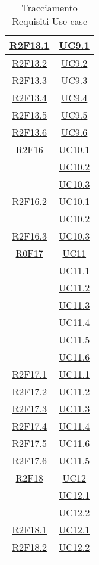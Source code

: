 \begin{longtable}{|c|c|}
\hline
\hyperlink{R2F13.1}{R2F13.1} & \hyperlink{UC9.1}{UC9.1}\\
\hline
\hyperlink{R2F13.2}{R2F13.2} & \hyperlink{UC9.2}{UC9.2}\\
\hline
\hyperlink{R2F13.3}{R2F13.3} & \hyperlink{UC9.3}{UC9.3}\\
\hline
\hyperlink{R2F13.4}{R2F13.4} & \hyperlink{UC9.4}{UC9.4}\\
\hline
\hyperlink{R2F13.5}{R2F13.5} & \hyperlink{UC9.5}{UC9.5}\\
\hline
\hyperlink{R2F13.6}{R2F13.6} & \hyperlink{UC9.6}{UC9.6}\\
\hline
\hyperlink{R2F16}{R2F16} & \hyperlink{UC10.1}{UC10.1}\\
& \hyperlink{UC10.2}{UC10.2}\\
& \hyperlink{UC10.3}{UC10.3}\\
\hline
\hyperlink{R2F16.2}{R2F16.2} & \hyperlink{UC10.1}{UC10.1}\\
& \hyperlink{UC10.2}{UC10.2}\\
\hline
\hyperlink{R2F16.3}{R2F16.3} & \hyperlink{UC10.3}{UC10.3}\\
\hline
\hyperlink{R0F17}{R0F17} & \hyperlink{UC11}{UC11}\\
& \hyperlink{UC11.1}{UC11.1}\\
& \hyperlink{UC11.2}{UC11.2}\\
& \hyperlink{UC11.3}{UC11.3}\\
& \hyperlink{UC11.4}{UC11.4}\\
& \hyperlink{UC11.5}{UC11.5}\\
& \hyperlink{UC11.6}{UC11.6}\\
\hline
\hyperlink{R2F17.1}{R2F17.1} & \hyperlink{UC11.1}{UC11.1}\\
\hline
\hyperlink{R2F17.2}{R2F17.2} & \hyperlink{UC11.2}{UC11.2}\\
\hline
\hyperlink{R2F17.3}{R2F17.3} & \hyperlink{UC11.3}{UC11.3}\\
\hline
\hyperlink{R2F17.4}{R2F17.4} & \hyperlink{UC11.4}{UC11.4}\\
\hline
\hyperlink{R2F17.5}{R2F17.5} & \hyperlink{UC11.6}{UC11.6}\\
\hline
\hyperlink{R2F17.6}{R2F17.6} & \hyperlink{UC11.5}{UC11.5}\\
\hline
\hyperlink{R2F18}{R2F18} & \hyperlink{UC12}{UC12}\\
& \hyperlink{UC12.1}{UC12.1}\\
& \hyperlink{UC12.2}{UC12.2}\\
\hline
\hyperlink{R2F18.1}{R2F18.1} & \hyperlink{UC12.1}{UC12.1}\\
\hline
\hyperlink{R2F18.2}{R2F18.2} & \hyperlink{UC12.2}{UC12.2}\\
\hline
\caption[Tracciamento Requisiti-Use case]{Tracciamento Requisiti-Use case}
\label{tabella:requi-usecase}
\end{longtable}
